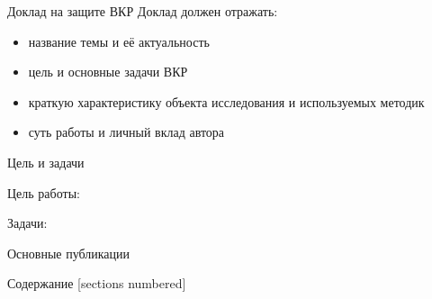 \begin{frame}
  \setcounter{framenumber}{1}
  \maketitle
\end{frame}

\begin{frame}{Доклад на защите ВКР}
  Доклад должен отражать:
  \begin{itemize}
    \item название темы и её актуальность
    \item цель и основные задачи ВКР
    \item краткую характеристику объекта исследования и используемых методик
    \item суть работы и личный вклад автора
  \end{itemize}
\end{frame}

\begin{frame}[t]{Цель и задачи}
  \begin{block}{Цель работы:}\vspace{0pt}
    \aim
  \end{block}

  \medskip
  \begin{block}{Задачи:}\vspace{0pt}
    \tasks
  \end{block}
\end{frame}

\begin{frame}{Основные публикации}

  \nocite{vakbib1}
  \nocite{bib1}
  \nocite{bib2}
  \nocite{confbib1}

  \printbibliography[heading=nobibheading]
\end{frame}


\begin{frame}{Содержание}
  [sections numbered]
  \tableofcontents[hideallsubsections]
\end{frame}
